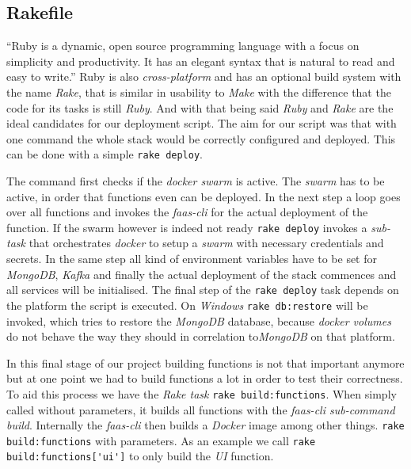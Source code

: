 \subsection{Rakefile}

“Ruby is a dynamic, open source programming language with a focus on simplicity and productivity. It
has an elegant syntax that is natural to read and easy to write.” \cite{ruby} Ruby is also
\textit{cross-platform} and has an optional build system with the name \textit{Rake}, that is
similar in usability to \textit{Make} with the difference that the code for its tasks is still
\textit{Ruby}. And with that being said \textit{Ruby} and \textit{Rake} are the ideal candidates for
our deployment script. The aim for our script was that with one command the whole stack would be
correctly configured and deployed. This can be done with a simple \lstinline{rake deploy}.

The command first checks if the \textit{docker swarm} is active. The \textit{swarm} has to be
active, in order that functions even can be deployed. In the next step a loop goes over all
functions and invokes the \textit{faas-cli} for the actual deployment of the function. If the swarm
however is indeed not ready \lstinline{rake deploy} invokes a \textit{sub-task} that orchestrates
\textit{docker} to setup a \textit{swarm} with necessary credentials and secrets. In the same step
all kind of environment variables have to be set for \textit{MongoDB}, \textit{Kafka} and finally
the actual deployment of the stack commences and all services will be initialised. The final step of
the \lstinline{rake deploy} task depends on the platform the script is executed. On \textit{Windows}
\lstinline{rake db:restore} will be invoked, which tries to restore the \textit{MongoDB} database,
because \textit{docker volumes} do not behave the way they should in correlation to\textit{MongoDB}
on that platform.

In this final stage of our project building functions is not that important anymore but at one point
we had to build functions a lot in order to test their correctness. To aid this process we have the
\textit{Rake task} \lstinline{rake build:functions}. When simply called without parameters, it builds
all functions with the \textit{faas-cli sub-command build}. Internally the \textit{faas-cli} then builds
a \textit{Docker} image among other things. \lstinline{rake build:functions} with parameters. As an
example we call \lstinline{rake build:functions['ui']} to only build the \textit{UI} function.

